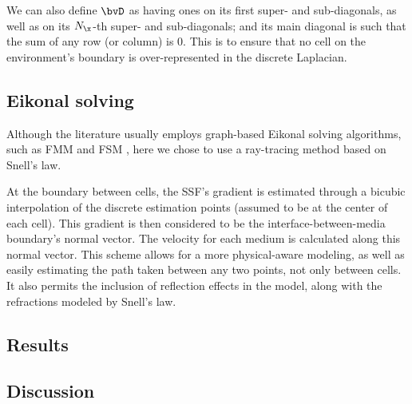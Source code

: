 We can also define $\bvD$ as having ones on its first super- and sub-diagonals, as well as on its $N_{\x}$-th super- and sub-diagonals; and its main diagonal is such that the sum of any row (or column) is $0$. This is to ensure that no cell on the environment's boundary is over-represented in the discrete Laplacian.
\subsection{Eikonal solving}

Although the literature usually employs graph-based Eikonal solving algorithms, such as FMM \cite{chopp_improvements_2001,sethian_fast_1999} and FSM \cite{tang_travel_2024}, here we chose to use a ray-tracing method based on Snell's law.

At the boundary between cells, the SSF's gradient is estimated through a bicubic interpolation of the discrete estimation points (assumed to be at the center of each cell). This gradient is then considered to be the interface-between-media boundary's normal vector. The velocity for each medium is calculated along this normal vector. This scheme allows for a more physical-aware modeling, as well as easily estimating the path taken between any two points, not only between cells. It also permits the inclusion of reflection effects in the model, along with the refractions modeled by Snell's law.

\subsection{Results}

\subsection{Discussion}